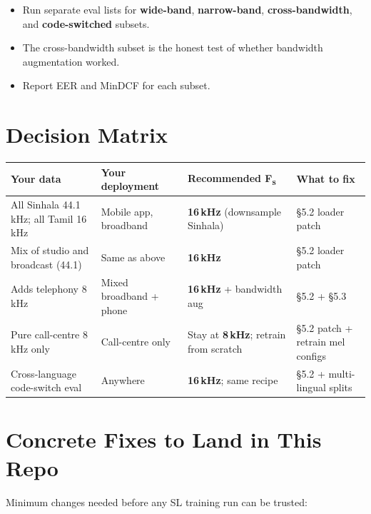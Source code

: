 \documentclass[11pt,a4paper]{article}
\begin{document}
\begin{itemize}
  \item Run separate eval lists for \textbf{wide-band}, \textbf{narrow-band},
    \textbf{cross-bandwidth}, and \textbf{code-switched} subsets.
  \item The cross-bandwidth subset is the honest test of whether bandwidth augmentation worked.
  \item Report EER and MinDCF for each subset.
\end{itemize}

\section{Decision Matrix}
\label{sec:matrix}

\begin{center}
\begin{tabular}{p{3.5cm}p{3cm}p{2.5cm}p{4cm}}
\toprule
Your data & Your deployment & Recommended F\textsubscript{s} & What to fix \\
\midrule
All Sinhala 44.1\,kHz; all Tamil 16\,kHz & Mobile app, broadband &
  \textbf{16\,kHz} (downsample Sinhala) & \S5.2 loader patch \\[4pt]
Mix of studio and broadcast (44.1) & Same as above &
  \textbf{16\,kHz} & \S5.2 loader patch \\[4pt]
Adds telephony 8\,kHz & Mixed broadband + phone &
  \textbf{16\,kHz} + bandwidth aug & \S5.2 + \S5.3 \\[4pt]
Pure call-centre 8\,kHz only & Call-centre only &
  Stay at \textbf{8\,kHz}; retrain from scratch & \S5.2 patch + retrain mel configs \\[4pt]
Cross-language code-switch eval & Anywhere &
  \textbf{16\,kHz}; same recipe & \S5.2 + multi-lingual splits \\
\bottomrule
\end{tabular}
\end{center}

\section{Concrete Fixes to Land in This Repo}
\label{sec:fixes}

Minimum changes needed before any SL training run can be trusted:
\end{document}
